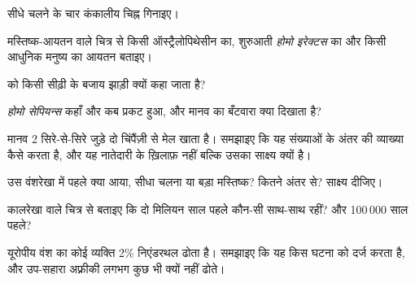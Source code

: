 \begin{exercise}[$\star$]\label{exo:g12:human-evolution:2}
सीधे चलने के चार कंकालीय चिह्न गिनाइए।
\end{exercise}

\begin{exercise}[$\star$]\label{exo:g12:human-evolution:3}
मस्तिष्क-आयतन वाले चित्र से किसी ऑस्ट्रैलोपिथेसीन का, शुरुआती \emph{होमो
इरेक्टस} का और किसी आधुनिक मनुष्य का आयतन बताइए।
\end{exercise}

\begin{exercise}[$\star$]\label{exo:g12:human-evolution:4}
 को किसी सीढ़ी के बजाय झाड़ी क्यों कहा जाता है?
\end{exercise}

\begin{exercise}[$\star$]\label{exo:g12:human-evolution:5}
\emph{होमो सेपियन्स} कहाँ और कब प्रकट हुआ, और मानव  का
बँटवारा क्या दिखाता है?
\end{exercise}

\begin{exercise}[$\star\star$]\label{exo:g12:human-evolution:6}
मानव  2 सिरे-से-सिरे जुड़े दो चिंपैंज़ी  से मेल खाता है।
समझाइए कि यह  संख्याओं के अंतर की व्याख्या कैसे करता है, और यह
नातेदारी के ख़िलाफ़ नहीं बल्कि उसका साक्ष्य क्यों है।
\end{exercise}

\begin{exercise}[$\star\star$]\label{exo:g12:human-evolution:7}
उस वंशरेखा में पहले क्या आया, सीधा चलना या बड़ा मस्तिष्क? कितने अंतर से?
साक्ष्य दीजिए।
\end{exercise}

\begin{exercise}[$\star\star$]\label{exo:g12:human-evolution:8}
कालरेखा वाले चित्र से बताइए कि दो मिलियन साल पहले कौन-सी  साथ-साथ
रहीं? और 100\,000 साल पहले?
\end{exercise}

\begin{exercise}[$\star\star$]\label{exo:g12:human-evolution:9}
यूरोपीय वंश का कोई व्यक्ति 2\% निएंडरथल  ढोता है। समझाइए कि यह किस घटना
को दर्ज करता है, और उप-सहारा अफ़्रीकी लगभग कुछ भी क्यों नहीं ढोते।
\end{exercise}

